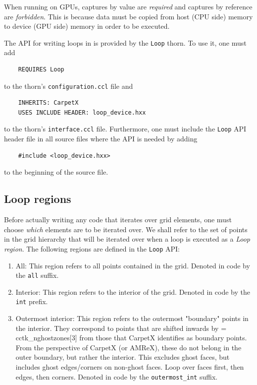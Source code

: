 When running on GPUs, captures by value are \textit{required} and captures by reference are \textit{forbidden}. This is because data must be copied from host (CPU side) memory to device (GPU side) memory in order to be executed.

The API for writing loops in \CarpetX\space is provided by the \texttt{Loop} thorn. To use it, one must add
%
\begin{verbatim}
    REQUIRES Loop
\end{verbatim}
%
to the thorn's \texttt{configuration.ccl} file and
%
\begin{verbatim}
    INHERITS: CarpetX
    USES INCLUDE HEADER: loop_device.hxx
\end{verbatim}
%
to the thorn's \texttt{interface.ccl} file. Furthermore, one must include the \texttt{Loop} API header file in all source files where the API is needed by adding
%
\begin{verbatim}
    #include <loop_device.hxx>
\end{verbatim}
%
to the beginning of the source file.

\subsection{Loop regions}
\label{sec:loop_regions}

Before actually writing any code that iterates over grid elements, one must choose \textit{which} elements are to be iterated over. We shall refer to the set of points in the grid hierarchy that will be iterated over when a loop is executed as a \textit{Loop region}. The following regions are defined in the \texttt{Loop} API:

\begin{enumerate}
    \item All: This region refers to all points contained in the grid. Denoted in code by the \texttt{all} suffix.
    
    \item Interior: This region refers to the interior of the grid. Denoted in code by the \texttt{int} prefix.
    
    \item Outermost interior: This region refers to the outermost "boundary" points in the interior. They correspond to points that are shifted inwards by = cctk\_nghostzones[3] from those that CarpetX identifies as boundary points. From the perspective of CarpetX (or AMReX), these do not belong in the outer boundary, but rather the interior. This excludes ghost faces, but includes ghost edges/corners on non-ghost faces. Loop over faces first, then edges, then corners. Denoted in code by the \texttt{outermost\_int} suffix.
\end{enumerate}

